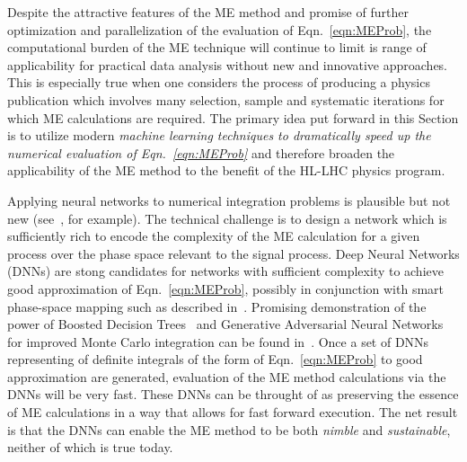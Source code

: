 Despite the attractive features of the ME method and promise of further optimization and parallelization of the evaluation of Eqn.~\ref{eqn:MEProb}, the computational burden of the ME technique will continue to limit is range of applicability for practical data analysis without new and innovative approaches. This is especially true when one considers the process of producing a physics publication which involves many selection, sample and systematic iterations for which ME calculations are required. The primary idea put forward in this Section is to utilize modern \emph{machine learning techniques to dramatically speed up the numerical evaluation of Eqn.~\ref{eqn:MEProb}} and therefore broaden the applicability of the ME method to the benefit of the HL-LHC physics program.

Applying neural networks to numerical integration problems is plausible but not new (see~\cite{CSEarticle2006,TICNC4344207,IJMC2013}, for example). The technical challenge is to design a network which is sufficiently rich to encode the complexity of the ME calculation for a given process over the phase space relevant to the signal process. Deep Neural Networks (DNNs) are stong candidates for networks with sufficient complexity to achieve good approximation of Eqn.~\ref{eqn:MEProb}, possibly in conjunction with smart phase-space mapping such as described in~\cite{Artoisenet:2010cn}. Promising demonstration of the power of Boosted Decision Trees~\cite{friedman2000,friedman2001} and Generative Adversarial Neural Networks~\cite{GAN2014arXiv1406.2661G} for improved Monte Carlo integration can be found in~\cite{Bendavid:2017zhk}. Once a set of DNNs representing of definite integrals of the form of Eqn.~\ref{eqn:MEProb} to good approximation are generated, evaluation of the ME method calculations via the DNNs will be very fast. These DNNs can be throught of as preserving the essence of ME calculations in a way that allows for fast forward execution. The net result is that the DNNs can enable the ME method to be both \emph{nimble} and \emph{sustainable}, neither of which is true today.

